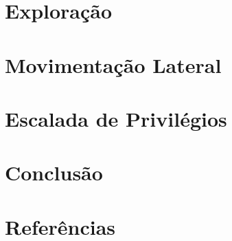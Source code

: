 \documentclass[12pt]{article} %
\begin{document}
\section{Exploração}

\section{Movimentação Lateral}

\section{Escalada de Privilégios}

\section{Conclusão}

\section{Referências}
\end{document}
